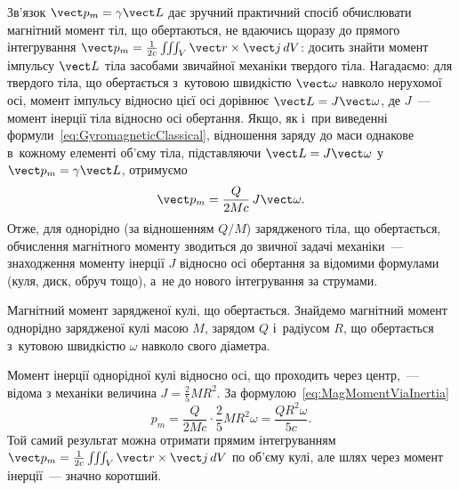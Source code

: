 Зв'язок $\vect p_m = \gamma\vect L$ дає зручний практичний спосіб обчислювати магнітний
момент тіл, що обертаються, не вдаючись щоразу до прямого інтегрування $\vect p_m =
	\frac1{2c}\iiint_V \vect r\times\vect j\, dV$: досить знайти момент імпульсу $\vect L$
тіла засобами звичайної механіки твердого тіла. Нагадаємо: для твердого тіла, що
обертається з~кутовою швидкістю $\vect\omega$ навколо нерухомої осі, момент імпульсу
відносно цієї осі дорівнює $\vect L = J\vect\omega$, де $J$~--- момент інерції тіла
відносно осі обертання. Якщо, як і~при виведенні формули~\eqref{eq:GyromagneticClassical},
відношення заряду до маси однакове в~кожному елементі об'єму тіла, підставляючи $\vect
	L=J\vect\omega$ у~$\vect p_m=\gamma\vect L$, отримуємо
\begin{equation}\label{eq:MagMomentViaInertia}
	\vect p_m = \frac{Q}{2Mc}\, J\vect\omega.
\end{equation}
Отже, для однорідно (за відношенням $Q/M$) зарядженого тіла, що обертається, обчислення
магнітного моменту зводиться до звичної задачі механіки~--- знаходження моменту інерції
$J$ відносно осі обертання за відомими формулами (куля, диск, обруч тощо), а~не до нового
інтегрування за струмами.

\begin{Example}{Магнітний момент зарядженої кулі, що обертається.}
	Знайдемо магнітний момент однорідно зарядженої кулі масою $M$, зарядом $Q$ і~радіусом $R$,
	що обертається з~кутовою швидкістю $\omega$ навколо свого діаметра.

	\begin{wrapstuff}[type=figure, width=0.1\linewidth, o]%
	\end{wrapstuff}

	Момент інерції однорідної кулі відносно осі, що проходить через центр,~--- відома з
	механіки величина $J=\frac25 MR^2$. За формулою~\eqref{eq:MagMomentViaInertia}
	\begin{equation*}
		p_m = \frac{Q}{2Mc}\cdot\frac25 MR^2\omega = \frac{QR^2\omega}{5c}.
	\end{equation*}
	Той самий результат можна отримати прямим інтегруванням $\vect p_m = \frac1{2c}\iiint_V
		\vect r\times\vect j\, dV$ по об'єму кулі, але шлях через момент інерції~--- значно
	коротший.
\end{Example}


